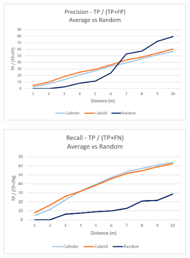 \documentclass{subfiles}
\begin{document}
           \begin{figure} [h!]
           	\centering
           	\includegraphics[width=0.87\textwidth]{img/dead/results/Precision_AveRan}
           	\caption{}
           	\label{fig:Precision_AveRan}
           \end{figure}
        
           
           \begin{figure} [h!]
           	\centering
           	\includegraphics[width=0.87\textwidth]{img/dead/results/Recall_AveRan}
           	\caption{}
           	\label{fig:Recall_AveRan}
           \end{figure}
           

\end{document}
